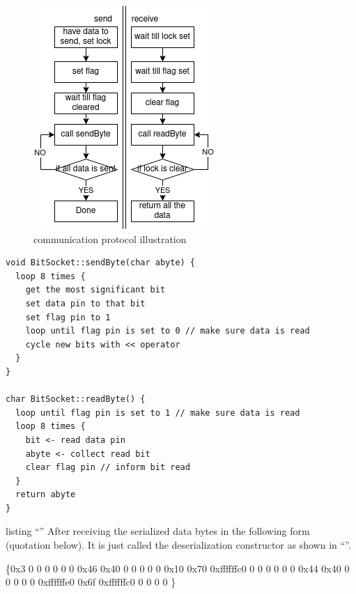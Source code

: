 \documentclass[11pt]{article}
\begin{document}
\begin{multicols*}{2}
\begin{figure}[H]
  \centering
  \includegraphics[width=0.75\columnwidth]{communication-protocol}
  \caption{communication protocol illustration}
  \label{fig:communication-protocol}
\end{figure}
\figsquish

\begin{lstlisting}[caption={BitSocket class methods illustration}]
void BitSocket::sendByte(char abyte) {
  loop 8 times {
    get the most significant bit
    set data pin to that bit
    set flag pin to 1
    loop until flag pin is set to 0 // make sure data is read
    cycle new bits with << operator
  }
}

char BitSocket::readByte() {
  loop until flag pin is set to 1 // make sure data is read
  loop 8 times {
    bit <- read data pin
    abyte <- collect read bit
    clear flag pin // inform bit read
  }
  return abyte
}
\end{lstlisting}

listing ``''
After receiving the serialized data bytes in the following form (quotation below). It is just called the deserialization constructor as shown in ``''.

\begin{displayquote}
\{0x3 0 0 0 0 0 0 0x46 0x40 0 0 0 0 0 0x10 0x70 0xffffffc0 0 0 0 0 0 0 0x44 0x40 0 0 0 0 0 0xffffffe0 0x6f 0xffffffc0 0 0 0 0 \}
\end{displayquote}


\end{multicols*}
\end{document}
